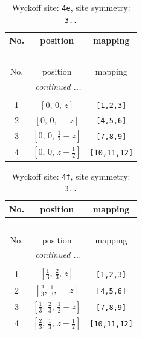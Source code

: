 \documentclass[fleqn,8pt]{jsarticle}
\begin{document}
\begin{longtable}{ccc}
\caption{Wyckoff site: {\tt 4e}, site symmetry: {\tt 3..}}
 \\
 \hline \hline
No. & position & mapping \\ \hline \endfirsthead

\multicolumn{2}{l}{\tablename\ \thetable{}} \\
 \hline \hline
No. & position & mapping \\ \hline \endhead

 \hline \hline
\multicolumn{2}{r}{\footnotesize\it continued ...} \\ \endfoot

 \hline \hline
\multicolumn{2}{r}{} \\ \endlastfoot

1 & $\left[ 0,\, 0,\, z \right]$ & {\tt [1,2,3]} \\ \hline
2 & $\left[ 0,\, 0,\, - z \right]$ & {\tt [4,5,6]} \\ \hline
3 & $\left[ 0,\, 0,\, \frac{1}{2} - z \right]$ & {\tt [7,8,9]} \\ \hline
4 & $\left[ 0,\, 0,\, z + \frac{1}{2} \right]$ & {\tt [10,11,12]} \\
\end{longtable}
\renewcommand{\arraystretch}{1.2}
\begin{longtable}{ccc}
\caption{Wyckoff site: {\tt 4f}, site symmetry: {\tt 3..}}
 \\
 \hline \hline
No. & position & mapping \\ \hline \endfirsthead

\multicolumn{2}{l}{\tablename\ \thetable{}} \\
 \hline \hline
No. & position & mapping \\ \hline \endhead

 \hline \hline
\multicolumn{2}{r}{\footnotesize\it continued ...} \\ \endfoot

 \hline \hline
\multicolumn{2}{r}{} \\ \endlastfoot

1 & $\left[ \frac{1}{3},\, \frac{2}{3},\, z \right]$ & {\tt [1,2,3]} \\ \hline
2 & $\left[ \frac{2}{3},\, \frac{1}{3},\, - z \right]$ & {\tt [4,5,6]} \\ \hline
3 & $\left[ \frac{1}{3},\, \frac{2}{3},\, \frac{1}{2} - z \right]$ & {\tt [7,8,9]} \\ \hline
4 & $\left[ \frac{2}{3},\, \frac{1}{3},\, z + \frac{1}{2} \right]$ & {\tt [10,11,12]} \\
\end{longtable}
\end{document}
